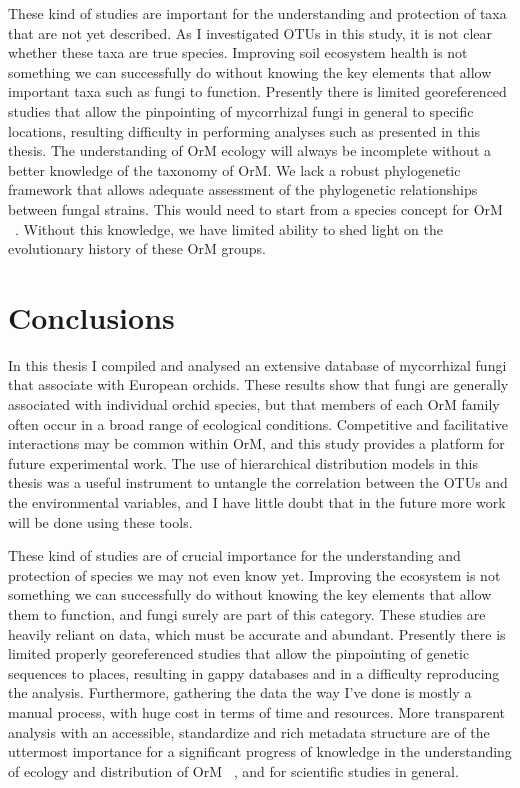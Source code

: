 These kind of studies are important for the understanding and protection of taxa that are not yet described. As I investigated OTUs in this study, it is not clear whether these taxa are true species. Improving soil ecosystem health is not something we can successfully do without knowing the key elements that allow important taxa such as fungi to function. Presently there is limited georeferenced studies that allow the pinpointing of mycorrhizal fungi in general to specific locations, resulting difficulty in performing analyses such as presented in this thesis. The understanding of OrM ecology will always be incomplete without a better knowledge of the taxonomy of OrM. We lack a robust phylogenetic framework that allows adequate assessment of the phylogenetic relationships between fungal strains. This would need to start from a species concept for OrM ~\citep{jacquemyn2017}. Without this knowledge, we have limited ability to shed light on the evolutionary history of these OrM groups.

\part{Conclusions}
\label{conclusions}

In this thesis I compiled and analysed an extensive database of mycorrhizal fungi that associate with European orchids. These results show that fungi are generally associated with individual orchid species, but that members of each OrM family often occur in a broad range of ecological conditions. Competitive and facilitative interactions may be common within OrM, and this study provides a platform for future experimental work. The use of hierarchical distribution models in this thesis was a useful instrument to untangle the correlation between the OTUs and the environmental variables, and I have little doubt that in the future more work will be done using these tools.

These kind of studies are of crucial importance for the understanding and protection of species we may not even know yet. Improving the ecosystem is not something we can successfully do without knowing the key elements that allow them to function, and fungi surely are part of this category. These studies are heavily reliant on data, which must be accurate and abundant. Presently there is limited properly georeferenced studies that allow the pinpointing of genetic sequences to places, resulting in gappy databases and in a difficulty reproducing the analysis.
Furthermore, gathering the data the way I've done is mostly a manual process, with huge cost in terms of time and resources. More transparent analysis with an accessible, standardize and rich metadata structure are of the uttermost importance for a significant progress of knowledge in the understanding of ecology and distribution of OrM ~\citep{powers2019}, and for scientific studies in general.

